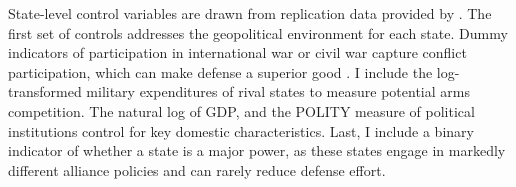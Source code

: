 \documentclass[12pt]{article}
\begin{document}
State-level control variables are drawn from replication data provided by \citet{DigiuseppePoast2016}. The first set of controls addresses the geopolitical environment for each state. Dummy indicators of participation in international war or civil war capture conflict participation, which can make defense a superior good \citep{OlsonZeckhauser1966}. I include the log-transformed military expenditures of rival states to measure potential arms competition. The natural log of GDP, and the POLITY measure of political institutions control for key domestic characteristics. Last, I include a binary indicator of whether a state is a major power, as these states engage in markedly different alliance policies and can rarely reduce defense effort. 



















  
% 
\end{document}
